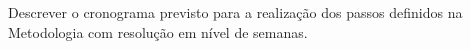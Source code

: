 Descrever o cronograma previsto para a realização dos
passos definidos na Metodologia com resolução em nível de semanas.